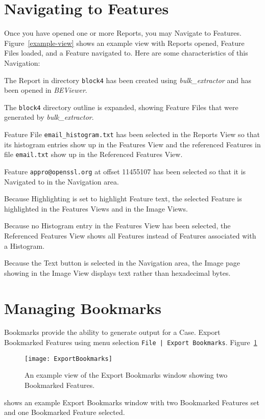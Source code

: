 \documentclass[10pt,twoside]{article}
\newcommand{\bulk}{\emph{bulk\_extractor}\xspace}
\newcommand{\bev}{\emph{BEViewer}\xspace}
\begin{document}
\section{Navigating to Features}
Once you have opened one or more Reports, you may Navigate to Features.
Figure~\ref{example-view}
shows an example view with Reports opened, Feature Files loaded, and a Feature navigated to.
Here are some characteristics of this Navigation:
\begin{compactitem}
\item The Report in directory \texttt{block4} has been created using \bulk
and has been opened in \bev.
\item The \texttt{block4} directory outline is expanded,
showing Feature Files that were generated by \bulk.
\item Feature File \texttt{email\_histogram.txt} has been selected in the Reports View
so that its histogram entries show up in the Features View
and the referenced Features in file \texttt{email.txt} show up in the Referenced Features View.
\item Feature \texttt{appro@openssl.org} at offset 11455107 has been selected
so that it is Navigated to in the Navigation area.
\item Because Highlighting is set to highlight Feature text,
the selected Feature is highlighted in the Features Views and in the Image Views.
\item Because no Histogram entry in the Features View has been selected,
the Referenced Features View shows all Features instead of Features associated with a Histogram.
\item Because the Text button is selected in the Navigation area,
the Image page showing in the Image View displays text rather than hexadecimal bytes.
\end{compactitem}

\section{Managing Bookmarks}
Bookmarks provide the ability to generate output for a Case.
Export Bookmarked Features using menu selection \texttt{File | Export Bookmarks}.
Figure~\ref{export-bookmarks}
\begin{figure}
\center
\texttt{[image: ExportBookmarks]}
\caption{An example view of the Export Bookmarks window
showing two Bookmarked Features.\label{export-bookmarks}}
\end{figure}
shows an example Export Bookmarks window with two Bookmarked Features set
and one Bookmarked Feature selected.
\end{document}
